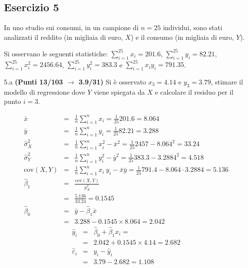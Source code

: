 \documentclass[
  11pt,
]{book}
\theoremstyle{mytheoremstyle}
\theoremstyle{mydefstyle}
\newenvironment{sol}
  {
  \begin{tcolorbox}[enhanced,breakable,arc=0.1mm,boxrule=1pt,colback=white,colframe=iblue,
  title=\bf \fontfamily{lmss}\selectfont \hspace{.5 cm} Soluzione,drop fuzzy shadow]

}{
\end{tcolorbox}
  }
\begin{document}
\subsection{Esercizio 5}\label{esercizio-5-35}

In uno studio sui consumi, in un campione di \(n=25\) individui, sono stati analizzati il reddito (in migliaia di euro, \(X\)) e il consumo (in migliaia di euro, \(Y\)).

Si osservano le seguenti statistiche:
\(\sum_{i=1}^{25}x_i=201.6\), \(\sum_{i=1}^{25}y_i=82.21\),
\(\sum_{i=1}^{25}x_i^2=2456.64\), \(\sum_{i=1}^{25}y_i^2=383.3\) e \(\sum_{i=1}^{25}x_iy_i=791.35\).

5.a \textbf{(Punti 13/103 \(\rightarrow\) 3.9/31)} Si è osservato \(x_3=4.14\) e \(y_3=3.79\), stimare il modello di regressione dove \(Y\) viene spiegata da \(X\) e calcolare il residuo per il punto \(i=3\).

\begin{sol}
\begin{eqnarray*}
           \bar x &=&\frac 1 n\sum_{i=1}^n x_i = \frac {1}{ 25 }  201.6 =  8.064 \\
           \bar y &=&\frac 1 n\sum_{i=1}^n y_i = \frac {1}{ 25 }  82.21 =  3.288 \\
           \hat\sigma_X^2&=&\frac 1 n\sum_{i=1}^n x_i^2-\bar x^2=\frac {1}{ 25 }  2457  - 8.064 ^2= 33.24 \\
           \hat\sigma_Y^2&=&\frac 1 n\sum_{i=1}^n y_i^2-\bar y^2=\frac {1}{ 25 }  383.3  - 3.2884 ^2= 4.518 \\
           \text{cov}(X,Y)&=&\frac 1 n\sum_{i=1}^n x_i~y_i-\bar x\bar y=\frac {1}{ 25 }  791.4 - 8.064 \cdot 3.2884 = 5.136 \\
           \hat\beta_1 &=& \frac{\text{cov}(X,Y)}{\hat\sigma_X^2} \\
                    &=& \frac{ 5.136 }{ 33.24 }  =  0.1545 \\
           \hat\beta_0 &=& \bar y - \hat\beta_1 \bar x\\
                    &=&  3.288 - 0.1545 \times  8.064 = 2.042 
         \end{eqnarray*}\begin{eqnarray*}
\hat y_i &=&\hat\beta_0+\hat\beta_1 x_i=\\ 
&=& 2.042 + 0.1545 \times 4.14 = 2.682 \\ 
\hat \varepsilon_i &=& y_i-\hat y_i\\ 
&=& 3.79 - 2.682 = 1.108  
\end{eqnarray*}

\end{sol}
\end{document}
